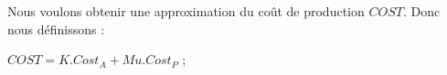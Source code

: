  
Nous voulons obtenir une approximation du coût de production $COST$. Donc nous définissons :

	$COST = K.Cost_A + Mu.Cost_P$ ;

